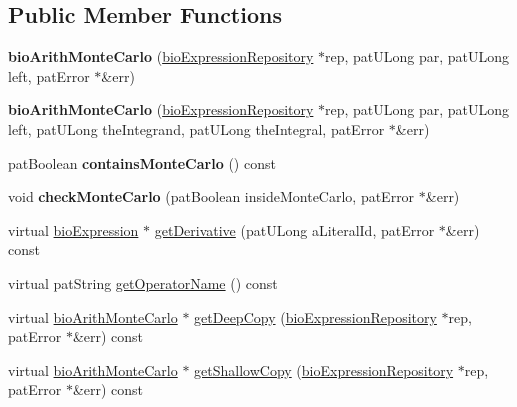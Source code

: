 \subsection*{Public Member Functions}
\begin{DoxyCompactItemize}
\item 
\mbox{\label{classbio_arith_monte_carlo_a9469254ad5760682005997afdb8ade34}} 
{\bfseries bio\+Arith\+Monte\+Carlo} (\hyperlink{classbio_expression_repository}{bio\+Expression\+Repository} $\ast$rep, pat\+U\+Long par, pat\+U\+Long left, pat\+Error $\ast$\&err)
\item 
\mbox{\label{classbio_arith_monte_carlo_a50b9d05e3d17a60468f61e290a765bba}} 
{\bfseries bio\+Arith\+Monte\+Carlo} (\hyperlink{classbio_expression_repository}{bio\+Expression\+Repository} $\ast$rep, pat\+U\+Long par, pat\+U\+Long left, pat\+U\+Long the\+Integrand, pat\+U\+Long the\+Integral, pat\+Error $\ast$\&err)
\item 
\mbox{\label{classbio_arith_monte_carlo_a3c813ed84fb565a36c1ef34c176acaa4}} 
pat\+Boolean {\bfseries contains\+Monte\+Carlo} () const
\item 
\mbox{\label{classbio_arith_monte_carlo_af1f16697ed740b5a94dc39d2fbe8afdc}} 
void {\bfseries check\+Monte\+Carlo} (pat\+Boolean inside\+Monte\+Carlo, pat\+Error $\ast$\&err)
\item 
virtual \hyperlink{classbio_expression}{bio\+Expression} $\ast$ \hyperlink{classbio_arith_monte_carlo_aae0ac80f1c463af6e6d1c3b227bae1e1}{get\+Derivative} (pat\+U\+Long a\+Literal\+Id, pat\+Error $\ast$\&err) const
\item 
virtual pat\+String \hyperlink{classbio_arith_monte_carlo_aa968b16e7b1982445c4aea9aee714d57}{get\+Operator\+Name} () const
\item 
virtual \hyperlink{classbio_arith_monte_carlo}{bio\+Arith\+Monte\+Carlo} $\ast$ \hyperlink{classbio_arith_monte_carlo_a91a8c51e8741c4667d1a61eb738f20f5}{get\+Deep\+Copy} (\hyperlink{classbio_expression_repository}{bio\+Expression\+Repository} $\ast$rep, pat\+Error $\ast$\&err) const
\item 
virtual \hyperlink{classbio_arith_monte_carlo}{bio\+Arith\+Monte\+Carlo} $\ast$ \hyperlink{classbio_arith_monte_carlo_ad91e62a31bbad6cb336f078747fbc7ae}{get\+Shallow\+Copy} (\hyperlink{classbio_expression_repository}{bio\+Expression\+Repository} $\ast$rep, pat\+Error $\ast$\&err) const

\end{DoxyCompactItemize}
